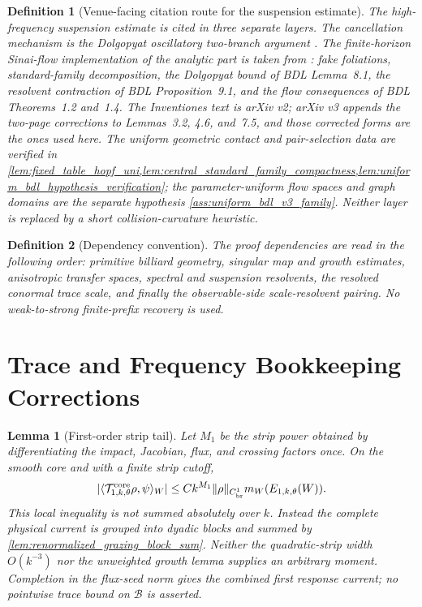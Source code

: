 \documentclass[11pt]{amsart}
\theoremstyle{compactplain}
\newtheorem*{lemma*}{Lemma}
\theoremstyle{compactdefinition}
\newtheorem*{definition*}{Definition}
\theoremstyle{compactremark}
\newcommand{\Bcal}{\mathcal B}
\begin{document}
\begin{definition*}[Venue-facing citation route for the suspension estimate]
The high-frequency suspension estimate is cited in three separate layers.  The
cancellation mechanism is the Dolgopyat oscillatory two-branch argument
\cite{Dolgopyat1998}.  The finite-horizon Sinai-flow implementation of the
analytic part is taken from
\cite[arXiv v3, including its correction note]{BaladiDemersLiverani2018}: fake foliations,
standard-family decomposition, the Dolgopyat bound of BDL Lemma~8.1, the
resolvent contraction of BDL Proposition~9.1, and the flow consequences of BDL
Theorems~1.2 and~1.4.  The Inventiones text is arXiv v2; arXiv v3 appends the
two-page corrections to Lemmas~3.2, 4.6, and~7.5, and those corrected forms are
the ones used here.  The uniform geometric contact and pair-selection data are
verified in
\cref{lem:fixed_table_hopf_uni,lem:central_standard_family_compactness,lem:uniform_bdl_hypothesis_verification};
the parameter-uniform flow spaces and graph domains are the separate hypothesis
\cref{ass:uniform_bdl_v3_family}.  Neither layer is replaced by a short
collision-curvature heuristic.
\end{definition*}

\begin{definition*}[Dependency convention]
The proof dependencies are read in the following order: primitive billiard
geometry, singular map and growth estimates, anisotropic transfer spaces,
spectral and suspension resolvents, the resolved conormal trace scale, and
finally the observable-side scale-resolvent pairing.  No weak-to-strong
finite-prefix recovery is used.
\end{definition*}

\section{Trace and Frequency Bookkeeping Corrections}

\begin{lemma*}[First-order strip tail]
Let \(M_1\) be the strip power obtained by differentiating the impact,
Jacobian, flux, and crossing factors once.  On the smooth core and with a
finite strip cutoff,
\[
  |\langle\mathcal T_{1,k,\theta}^{\rm core}\rho,\psi\rangle_W|
  \le C k^{M_1}\|\rho\|_{C^1_{\rm br}}m_W(E_{1,k,\theta}(W)).
\]
This local inequality is not summed absolutely over \(k\).  Instead the
complete physical current is grouped into dyadic blocks and summed by
\cref{lem:renormalized_grazing_block_sum}.  Neither the quadratic-strip width
\(O(k^{-3})\) nor the unweighted growth lemma supplies an arbitrary moment.
Completion in the flux-seed norm gives the combined first response current; no
pointwise trace bound on \(\Bcal\) is asserted.
\end{lemma*}
\end{document}
